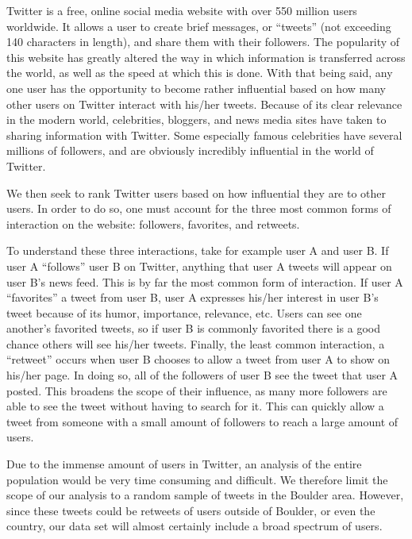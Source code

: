 Twitter is a free, online social media website with over 550 million users worldwide. It allows a user to create brief messages, or ``tweets'' (not exceeding 140 characters in length), and share them with their followers. The popularity of this website has greatly altered the way in which information is transferred across the world, as well as the speed at which this is done. With that being said, any one user has the opportunity to become rather influential based on how many other users on Twitter interact with his/her tweets. Because of its clear relevance in the modern world, celebrities, bloggers, and news media sites have taken to sharing information with Twitter. Some especially famous celebrities have several millions of followers, and are obviously incredibly influential in the world of Twitter.

    We then seek to rank Twitter users based on how influential they are to other users. In order to do so, one must account for the three most common forms of interaction on the website: followers, favorites, and retweets.

        To understand these three interactions, take for example user A and user B. If user A ``follows'' user B on Twitter, anything that user A tweets will appear on user B's news feed. This is by far the most common form of interaction. If user A ``favorites'' a tweet from user B, user A expresses his/her interest in user B's tweet because of its humor, importance, relevance, etc. Users can see one another's favorited tweets, so if user B is commonly favorited there is a good chance others will see his/her tweets. Finally, the least common interaction, a ``retweet'' occurs when user B chooses to allow a tweet from user A to show on his/her page. In doing so, all of the followers of user B see the tweet that user A posted. This broadens the scope of their influence, as many more followers are able to see the tweet without having to search for it. This can quickly allow a tweet from someone with a small amount of followers to reach a large amount of users.

                Due to the immense amount of users in Twitter, an analysis of the entire population would be very time consuming and difficult. We therefore limit the scope of our analysis to a random sample of tweets in the Boulder area. However, since these tweets could be retweets of users outside of Boulder, or even the country, our data set will almost certainly include a broad spectrum of users.
